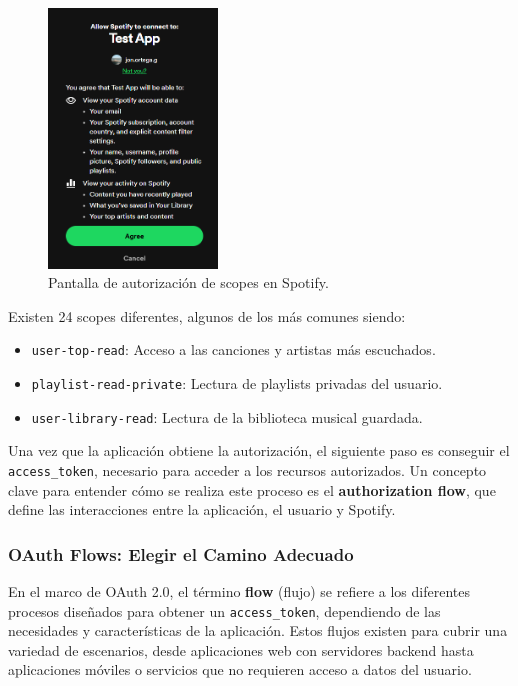 \begin{figure}[H]
    \centering
    \includegraphics[width=0.4\textwidth]{./figures/auth_popup.png}
    \caption{Pantalla de autorización de scopes en Spotify.}
    \label{fig:auth_popup}
\end{figure}

Existen 24 scopes diferentes, algunos de los más comunes siendo:
\begin{itemize}
    \setlength{\itemsep}{0pt}
    \item \texttt{user-top-read}: Acceso a las canciones y artistas más escuchados.
    \item \texttt{playlist-read-private}: Lectura de playlists privadas del usuario.
    \item \texttt{user-library-read}: Lectura de la biblioteca musical guardada.
\end{itemize}

Una vez que la aplicación obtiene la autorización, el siguiente paso es conseguir el \texttt{access\_token}, necesario para acceder a los recursos autorizados. Un concepto clave para entender cómo se realiza este proceso es el \textbf{authorization flow}, que define las interacciones entre la aplicación, el usuario y Spotify.

\subsubsection*{OAuth Flows: Elegir el Camino Adecuado}

En el marco de OAuth 2.0, el término \textbf{flow} (flujo) se refiere a los diferentes procesos diseñados para obtener un \texttt{access\_token}, dependiendo de las necesidades y características de la aplicación. Estos flujos existen para cubrir una variedad de escenarios, desde aplicaciones web con servidores backend hasta aplicaciones móviles o servicios que no requieren acceso a datos del usuario.

